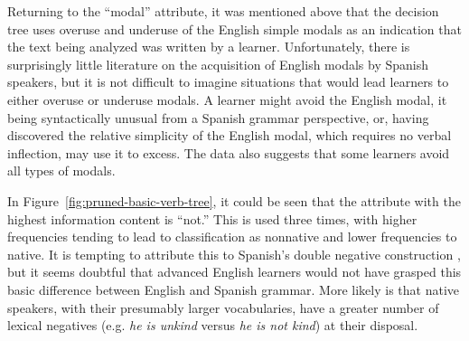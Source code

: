 \documentclass[main.tex]{subfiles}
\begin{document}
Returning to the ``modal'' attribute, it was mentioned above that the decision tree uses overuse and underuse of the English simple modals as an indication that the text being analyzed was written by a learner. Unfortunately, there is surprisingly little literature on the acquisition of English modals by Spanish speakers, but it is not difficult to imagine situations that would lead learners to either overuse or underuse modals. A learner might avoid the English modal, it being syntactically unusual from a Spanish grammar perspective, or, having discovered the relative simplicity of the English modal, which requires no verbal inflection, may use it to excess. The data also suggests that some learners avoid all types of modals.

In Figure~\ref{fig:pruned-basic-verb-tree}, it could be seen that the attribute with the highest information content is ``not.'' This is used three times, with higher frequencies tending to lead to classification as nonnative and lower frequencies to native. It is tempting to attribute this to Spanish's double negative construction \citep[pp. 344-5]{butt}, but it seems doubtful that advanced English learners would not have grasped this basic difference between English and Spanish grammar. More likely is that native speakers, with their presumably larger vocabularies, have a greater number of lexical negatives (e.g. \textit{he is unkind} versus \textit{he is not kind}) at their disposal.
\end{document}
